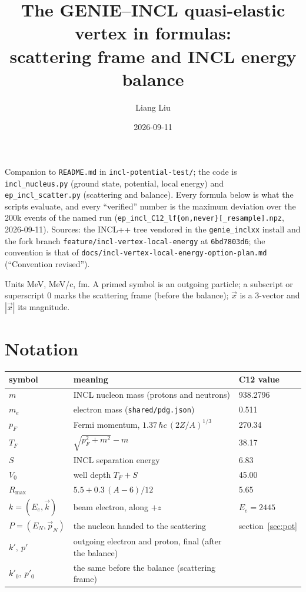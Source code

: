 \documentclass[11pt]{article}
\title{The GENIE--INCL quasi-elastic vertex in formulas:\\ scattering frame and INCL energy balance}
\author{Liang Liu}
\date{2026-09-11}
\newcommand{\vv}[1]{\vec{#1}}
\newcommand{\Rmax}{R_{\max}}
\newcommand{\pF}{p_F}
\newcommand{\TF}{T_F}
\newcommand{\Vz}{V_0}
\newcommand{\code}[1]{\texttt{#1}}
\begin{document}
\maketitle

Companion to \code{README.md} in \code{incl-potential-test/}; the code is
\code{incl\_nucleus.py} (ground state, potential, local energy) and
\code{ep\_incl\_scatter.py} (scattering and balance). Every formula below is what the
scripts evaluate, and every ``verified'' number is the maximum deviation over the
200k events of the named run (\code{ep\_incl\_C12\_lf\{on,never\}[\_resample].npz},
2026-09-11). Sources: the INCL++ tree vendored in the \code{genie\_inclxx} install and
the fork branch \code{feature/incl-vertex-local-energy} at \code{6bd7803d6}; the
convention is that of \code{docs/incl-vertex-local-energy-option-plan.md}
(``Convention revised'').

Units MeV, MeV/c, fm. A primed symbol is an outgoing particle; a subscript or
superscript $0$ marks the scattering frame (before the balance); $\vv x$ is a
3-vector and $|\vv x|$ its magnitude.

\section{Notation}
\begin{center}
\begin{tabular}{lll}
\toprule
symbol & meaning & C12 value \\
\midrule
$m$ & INCL nucleon mass (protons and neutrons) & 938.2796 \\
$m_e$ & electron mass (\code{shared/pdg.json}) & 0.511 \\
$\pF$ & Fermi momentum, $1.37\,\hbar c\,(2Z/A)^{1/3}$ & 270.34 \\
$\TF$ & $\sqrt{\pF^2+m^2}-m$ & 38.17 \\
$S$ & INCL separation energy & 6.83 \\
$\Vz$ & well depth $\TF+S$ & 45.00 \\
$\Rmax$ & $5.5+0.3\,(A-6)/12$ & 5.65 \\
$k=(E_e,\vv k)$ & beam electron, along $+z$ & $E_e=2445$ \\
$P=(E_N,\vv p_N)$ & the nucleon handed to the scattering & section~\ref{sec:pot} \\
$k',\ p'$ & outgoing electron and proton, final (after the balance) & \\
$k'_0,\ p'_0$ & the same before the balance (scattering frame) & \\
\bottomrule
\end{tabular}
\end{center}
\end{document}
